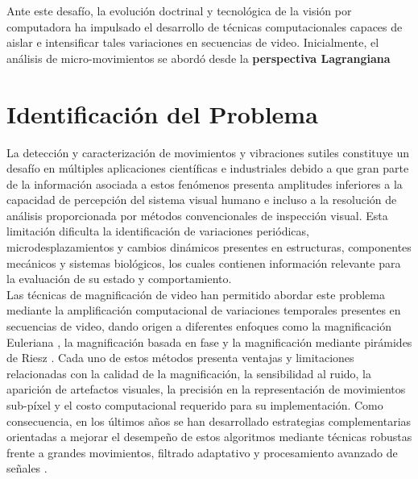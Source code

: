 Ante este desafío, la evolución doctrinal y tecnológica de la visión por computadora ha impulsado el desarrollo de técnicas computacionales capaces de aislar e intensificar tales variaciones en secuencias de video. Inicialmente, el análisis de micro-movimientos se abordó desde la \textbf{perspectiva Lagrangiana} 

\section{Identificación del Problema}
\label{sec:IdentificacionProblema}

La detección y caracterización de movimientos y vibraciones sutiles constituye un desafío en múltiples aplicaciones científicas e industriales debido a que gran parte de la información asociada a estos fenómenos presenta amplitudes inferiores a la capacidad de percepción del sistema visual humano e incluso a la resolución de análisis proporcionada por métodos convencionales de inspección visual. Esta limitación dificulta la identificación de variaciones periódicas, microdesplazamientos y cambios dinámicos presentes en estructuras, componentes mecánicos y sistemas biológicos, los cuales contienen información relevante para la evaluación de su estado y comportamiento.\\

Las técnicas de magnificación de video han permitido abordar este problema mediante la amplificación computacional de variaciones temporales presentes en secuencias de video, dando origen a diferentes enfoques como la magnificación Euleriana \cite{wu2012eulerian}, la magnificación basada en fase \cite{wadhwa2013phase} y la magnificación mediante pirámides de Riesz \cite{wadhwa2014riesz}. Cada uno de estos métodos presenta ventajas y limitaciones relacionadas con la calidad de la magnificación, la sensibilidad al ruido, la aparición de artefactos visuales, la precisión en la representación de movimientos sub-píxel y el costo computacional requerido para su implementación. Como consecuencia, en los últimos años se han desarrollado estrategias complementarias orientadas a mejorar el desempeño de estos algoritmos mediante técnicas robustas frente a grandes movimientos, filtrado adaptativo y procesamiento avanzado de señales \cite{elgharib2015video,takeda2018jerk,takeda2022bilateral}.\\

